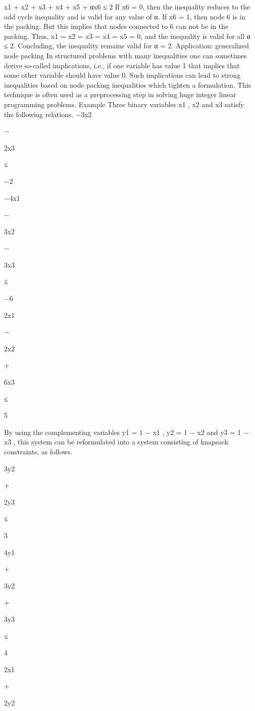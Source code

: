 \documentclass[titlepage]{book}
\theoremstyle{definition}
\begin{document}
x1 + x2 + x3 + x4 + x5 + αx6 ≤ 2
If x6 = 0, then the inequality reduces to the odd cycle inequality and is valid for any value of α. If x6 = 1,
then node 6 is in the packing. But this implies that nodes connected to 6 can not be in the packing.
Thus, x1 = x2 = x3 = x4 = x5 = 0, and the inequality is valid for all α ≤ 2. Concluding, the inequality
remains valid for α = 2.
Application: generalized node packing
In structured problems with many inequalities one can sometimes derive so-called implications, i.e., if one
variable has value 1 that implies that some other variable should have value 0. Such implications can lead
to strong inequalities based on node packing inequalities which tighten a formulation. This technique is
often used as a preprocessing step in solving huge integer linear programming problems.
Example
Three binary variables x1 , x2 and x3 satisfy the following relations.
−3x2

−

2x3

≤

−2

−4x1

−

3x2

−

3x3

≤

−6

2x1

−

2x2

+

6x3

≤

5

By using the complementing variables y1 = 1 − x1 , y2 = 1 − x2 and y3 = 1 − x3 , this system can be
reformulated into a system consisting of knapsack constraints, as follows.

3y2

+

2y3

≤

3

4y1

+

3y2

+

3y3

≤

4

2x1

+

2y2
\end{document}
